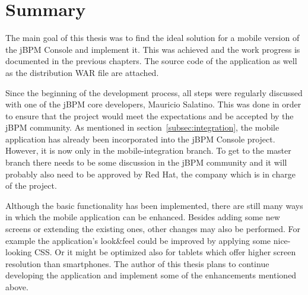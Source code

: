 \documentclass[12pt,oneside,final]{fithesis2}
\begin{document}
\chapter{Summary}
The main goal of this thesis was to find the ideal solution for a mobile version of the jBPM Console and implement it.
This was achieved and the work progress is documented in the previous chapters.
The source code of the application as well as the distribution WAR file are attached.

Since the beginning of the development process, all steps were regularly discussed with one of the jBPM core developers, Mauricio Salatino.
This was done in order to ensure that the project would meet the expectations and be accepted by the jBPM community.
As mentioned in section~\ref{subsec:integration}, the mobile application has already been incorporated into the jBPM Console project.
However, it is now only in the mobile-integration branch.
To get to the master branch there needs to be some discussion in the jBPM community and it will probably also need to be approved by Red Hat, the company which is in charge of the project.

Although the basic functionality has been implemented, there are still many ways in which the mobile application can be enhanced.
Besides adding some new screens or extending the existing ones, other changes may also be performed.
For example the application's look\&feel could be improved by applying some nice-looking CSS.
Or it might be optimized also for tablets which offer higher screen resolution than smartphones.
The author of this thesis plans to continue developing the application and implement some of the enhancements mentioned above.

\printbibliography
\end{document}
